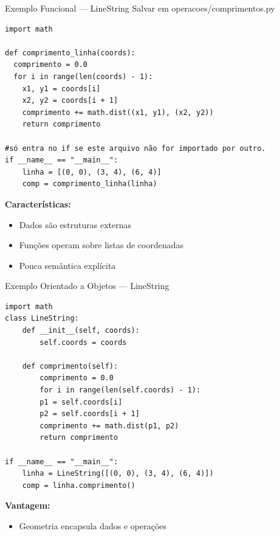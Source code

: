 \documentclass{beamer}
\begin{document}
\begin{frame}[fragile]{Exemplo Funcional — LineString}
  Salvar em operacoes/comprimentos.py
  \begin{verbatim}
import math

def comprimento_linha(coords):
  comprimento = 0.0
  for i in range(len(coords) - 1):
    x1, y1 = coords[i]
    x2, y2 = coords[i + 1]
    comprimento += math.dist((x1, y1), (x2, y2))
    return comprimento
    
#só entra no if se este arquivo não for importado por outro.
if __name__ == "__main__":
    linha = [(0, 0), (3, 4), (6, 4)]
    comp = comprimento_linha(linha)
\end{verbatim}
  
  \vspace{0.3cm}
  
  \textbf{Características:}
  \begin{itemize}
    \item Dados são estruturas externas
    \item Funções operam sobre listas de coordenadas
    \item Pouca semântica explícita
  \end{itemize}
  
\end{frame}

\begin{frame}[fragile]{Exemplo Orientado a Objetos — LineString}
    
    \begin{verbatim}
import math
class LineString:
    def __init__(self, coords):
        self.coords = coords

    def comprimento(self):
        comprimento = 0.0
        for i in range(len(self.coords) - 1):
        p1 = self.coords[i]
        p2 = self.coords[i + 1]
        comprimento += math.dist(p1, p2)
        return comprimento

if __name__ == "__main__":
    linha = LineString([(0, 0), (3, 4), (6, 4)])
    comp = linha.comprimento()
    \end{verbatim}
    
    \vspace{0.3cm}
    
    \textbf{Vantagem:}
    \begin{itemize}
        \item Geometria encapsula dados e operações
    \end{itemize}
    
\end{frame}
\end{document}
